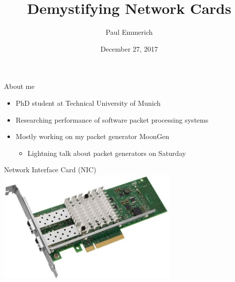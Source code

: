 \documentclass[NET,english,aspectratio=169]{tumbeamer}
\author{Paul Emmerich}
\title{Demystifying Network Cards}
\date{December 27, 2017}
\begin{document}
\begin{frame}{About me}
\begin{itemize}
\item PhD student at Technical University of Munich
\item Researching performance of software packet processing systems
\item Mostly working on my packet generator MoonGen
\begin{itemize}
\item<2-> Lightning talk about packet generators on Saturday
\end{itemize}
\end{itemize}
\pause
{}
\end{frame}


\begin{frame}{Network Interface Card (NIC)}
\centering\includegraphics[width=0.66\textwidth]{pics/nic2}
\end{frame}
\end{document}
